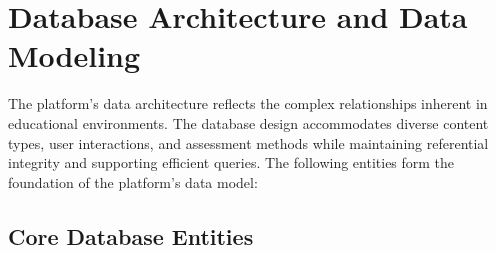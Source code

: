 \documentclass[12pt,a4paper]{article}
\begin{document}
\section{Database Architecture and Data Modeling}

The platform's data architecture reflects the complex relationships inherent in educational environments. The database design accommodates diverse content types, user interactions, and assessment methods while maintaining referential integrity and supporting efficient queries. The following entities form the foundation of the platform's data model:

\subsection{Core Database Entities}
\end{document}
